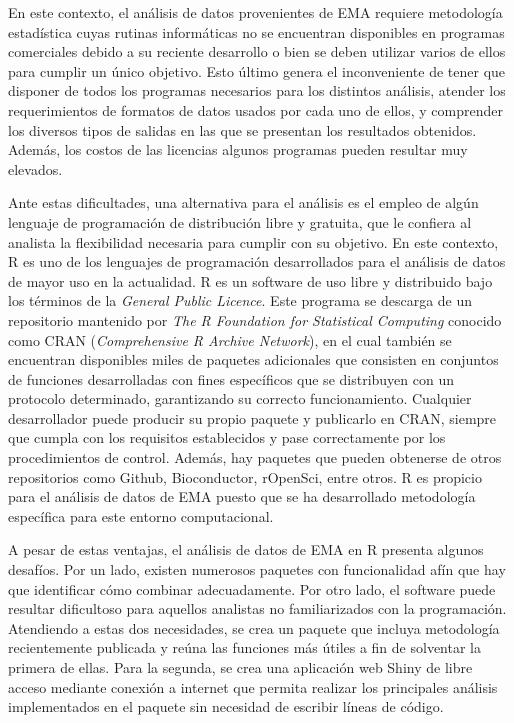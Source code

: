 En este contexto, el análisis de datos provenientes de EMA requiere metodología estadística cuyas rutinas informáticas no se encuentran disponibles en programas comerciales debido a su reciente desarrollo o bien se deben utilizar varios de ellos para cumplir un único objetivo. Esto último genera el inconveniente de tener que disponer de todos los programas necesarios para los distintos análisis, atender los requerimientos de formatos de datos usados por cada uno de ellos, y comprender los diversos tipos de salidas en las que se presentan los resultados obtenidos. Además, los costos de las licencias algunos programas pueden resultar muy elevados. 

Ante estas dificultades, una alternativa para el análisis es el empleo de algún lenguaje de programación de distribución libre y gratuita, que le confiera al analista la flexibilidad necesaria para cumplir con su objetivo. En este contexto, R es uno de los lenguajes de programación desarrollados para el análisis de datos de mayor uso en la actualidad. R es un software de uso libre y distribuido bajo los términos de la \emph{General Public Licence}. Este programa se descarga de un repositorio mantenido por \emph{The R Foundation for Statistical Computing} conocido como CRAN (\emph{Comprehensive R Archive Network}), en el cual también se encuentran disponibles miles de paquetes adicionales que consisten en conjuntos de funciones desarrolladas con fines específicos que se distribuyen con un protocolo determinado, garantizando su correcto funcionamiento. Cualquier desarrollador puede producir su propio paquete y publicarlo en CRAN, siempre que cumpla con los requisitos establecidos y pase correctamente por los procedimientos de control. Además, hay paquetes que pueden obtenerse de otros repositorios como Github, Bioconductor, rOpenSci, entre otros. R es propicio para el análisis de datos de EMA puesto que se ha desarrollado metodología específica para este entorno computacional. 

A pesar de estas ventajas, el análisis de datos de EMA en R presenta algunos desafíos. Por un lado, existen numerosos paquetes con funcionalidad afín que hay que identificar cómo combinar adecuadamente. Por otro lado, el software puede resultar dificultoso para aquellos analistas no familiarizados con la programación. Atendiendo a estas dos necesidades, se crea un paquete que incluya metodología recientemente publicada y reúna las funciones más útiles a fin de solventar la primera de ellas. Para la segunda, se crea una aplicación web Shiny de libre acceso mediante conexión a internet que permita realizar los principales análisis implementados en el paquete sin necesidad de escribir líneas de código. 

